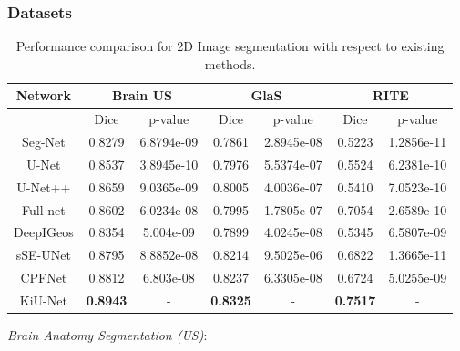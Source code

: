 \documentclass[journal,twoside,web]{ieeecolor}
\begin{document}
\subsubsection{Datasets}
\begin{table*}[htbp]
	\centering
	\caption{Performance comparison for 2D Image segmentation with respect to existing methods.}
	\begin{tabular}{c|cc|cc|cc}
		\hline
		Network   & \multicolumn{2}{c|}{Brain US}       & \multicolumn{2}{c|}{GlaS} & \multicolumn{2}{c}{RITE} \\ \hline
		& \multicolumn{1}{c|}{Dice} & p-value & \multicolumn{1}{c|}{Dice}        & p-value     & \multicolumn{1}{c|}{Dice}        & p-value     \\ \cline{2-7} 
		Seg-Net \cite{badrinarayanan2017segnet}  & 0.8279                    & 6.8794e-09        & 0.7861      & 2.8945e-08            & 0.5223      & 1.2856e-11            \\
		U-Net \cite{ronneberger2015u}    & 0.8537                    & 3.8945e-10        & 0.7976      & 5.5374e-07            & 0.5524      & 6.2381e-10            \\
		U-Net++  \cite{zhou2018unet++} & 0.8659                    & 9.0365e-09        & 0.8005      & 4.0036e-07            & 0.5410      & 7.0523e-10            \\
		Full-net \cite{qu2019improving} & 0.8602                    & 6.0234e-08         & 0.7995      & 1.7805e-07             & 0.7054      & 2.6589e-10             \\
		DeepIGeos \cite{wang2018deepigeos} & 0.8354                    & 5.004e-09        & 0.7899      & 4.0245e-08             & 0.5345      & 6.5807e-09            \\
		sSE-UNet \cite{roy2018recalibrating} & 0.8795                    & 8.8852e-08         & 0.8214      &9.5025e-06             & 0.6822      & 1.3665e-11            \\
		CPFNet \cite{feng2020cpfnet}   & 0.8812                    & 6.803e-08         & 0.8237      & 6.3305e-08             & 0.6724      & 5.0255e-09            \\
		KiU-Net   & \textbf{0.8943}                    & -         & \textbf{0.8325}      & -            & \textbf{0.7517}      & -           
	\end{tabular}
	
	
	\label{brain}
\end{table*}

\noindent\textit{Brain Anatomy Segmentation (US)}:
\end{document}

